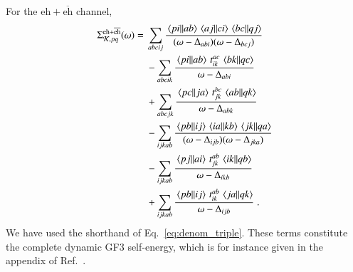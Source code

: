 \documentclass[aip,jcp,reprint,noshowkeys,superscriptaddress]{revtex4-1}
\newcommand{\cK}{\mathcal{K}}
\newcommand{\eh}{\text{eh}}
\newcommand{\teh}{\overline{\text{eh}}}
\begin{document}
For the $\eh+\teh$ channel, 
\begin{align}
\Sigma^{\eh+\teh}_{\cK,pq}(\omega)
={}&
\sum_{abcij}
\frac{\mel{pi}{}{ab}\mel{aj}{}{ci}\mel{bc}{}{qj}}
{(\omega-\Delta_{abi})(\omega-\Delta_{bcj})}
\label{eq:eh_in_plus}
\\
&-
\sum_{abcik}
\frac{\mel{pi}{}{ab}\,t_{ik}^{ac}\,\mel{bk}{}{qc}}
{\omega-\Delta_{abi}}
\label{eq:eh_lt_plus}
\\
&+
\sum_{abcjk}
\frac{\mel{pc}{}{ja}\,t_{jk}^{bc}\,\mel{ab}{}{qk}}
{\omega-\Delta_{abk}}
\label{eq:eh_gt_plus}
\\
&-
\sum_{ijkab}
\frac{\mel{pb}{}{ij}\mel{ia}{}{kb}\mel{jk}{}{qa}}
{(\omega-\Delta_{ijb})(\omega-\Delta_{jka})}
\label{eq:eh_in_minus}
\\
&-
\sum_{ijkab}
\frac{\mel{pj}{}{ai}\,t_{jk}^{ab}\,\mel{ik}{}{qb}}
{\omega-\Delta_{ikb}}
\label{eq:eh_lt_minus}
\\
&+
\sum_{ijkab}
\frac{\mel{pb}{}{ij}\,t_{ik}^{ab}\,\mel{ja}{}{qk}}
{\omega-\Delta_{ijb}} \;.
\label{eq:eh_gt_minus}
\end{align}
We have used the shorthand of Eq.~\eqref{eq:denom_triple}.
These terms constitute the complete dynamic GF3 self-energy, which is 
for instance given in the appendix of Ref.~.
\end{document}
